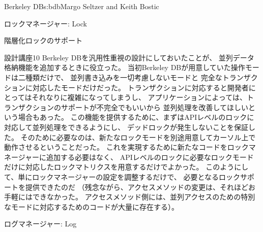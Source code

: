 \begin{aosachapter}{Berkeley DB}{s:bdb}{Margo Seltzer and Keith Bostic}
\begin{aosasect1}{ロックマネージャー: Lock}
\begin{aosasect2}{階層化ロックのサポート}
\begin{aosabox}{設計講座10}
Berkeley DBを汎用性重視の設計にしておいたことが、
並列データ格納機能を追加するときに役立った。
当初Berkeley DBが用意していた操作モードは二種類だけで、
並列書き込みを一切考慮しないモードと
完全なトランザクションに対応したモードだけだった。
トランザクションに対応すると開発者にとってはそれなりに複雑になってしまうし、
アプリケーションによっては、トランザクションのサポートが不完全でもいいから
並列処理を改善してほしいという場合もあった。
この機能を提供するために、まずはAPIレベルのロックに対応して並列処理をできるようにし、
デッドロックが発生しないことを保証した。
そのために必要なのは、新たなロックモードを別途用意してカーソル上で動作させるということだった。
これを実現するために新たなコードをロックマネージャーに追加する必要はなく、
APIレベルのロックに必要なロックモードだけに対応したロックマトリクスを用意するだけでよかった。
このようにして、単にロックマネージャーの設定を調整するだけで、
必要となるロックサポートを提供できたのだ
（残念ながら、アクセスメソッドの変更は、それほどお手軽にはできなかった。
アクセスメソッド側には、並列アクセスのための特別なモードに対応するためのコードが大量に存在する）。

\end{aosabox}

\end{aosasect2}

\end{aosasect1}

\begin{aosasect1}{ログマネージャー: Log}
\label{sec.bdb.log}


\end{aosasect1}
\end{aosachapter}
